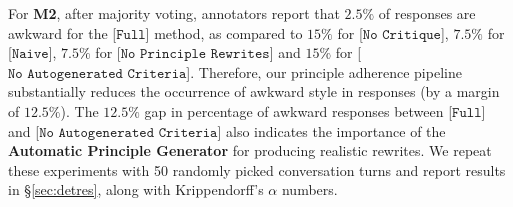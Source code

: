 \documentclass[11pt]{article}
\begin{document}
For \textbf{M2}, 
after majority voting, annotators report that $2.5\%$ of responses are awkward for the [$\texttt{Full}$] method, as compared to $15\%$ for [$\texttt{No Critique}$], $7.5\%$ for [$\texttt{Naive}$], $7.5\%$ for [$\texttt{No Principle Rewrites}$] and $15\%$ for [$\texttt{No Autogenerated Criteria}$]. Therefore, our principle adherence pipeline substantially reduces the occurrence of awkward style in responses (by a margin of $12.5\%$). The $12.5\%$ gap in percentage of awkward responses between [$\texttt{Full}$] and  [$\texttt{No Autogenerated Criteria}$] also indicates the importance of the \textbf{Automatic Principle Generator} for producing realistic rewrites. We repeat these experiments with 50 randomly picked conversation turns and report results in \S\ref{sec:detres}, along with Krippendorff's $\alpha$ numbers. 



\end{document}
